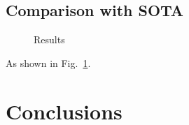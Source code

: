 \documentclass[compsoc]{IEEEtran}
\begin{document}
\subsection{Comparison with SOTA}
\label{sec:comparison-with-sota}

\begin{figure}[h]
  \centering
  \caption{Results}
  \label{fig:results}
\end{figure}

As shown in Fig.~\ref{fig:results}.

\section{Conclusions}
\label{sec:conclusions}




\end{document}

